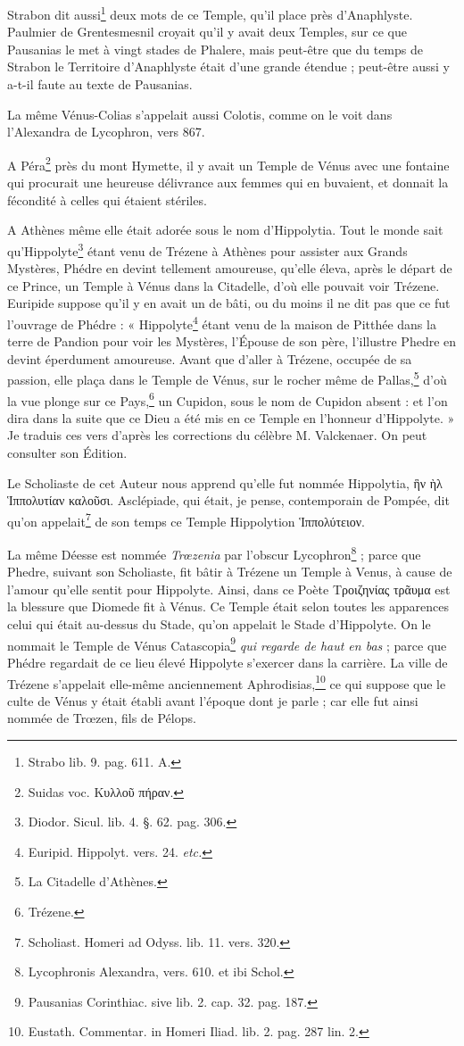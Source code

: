 \documentclass[a4paper, 18pt, oneside]{article}
\begin{document}
Strabon dit aussi\footnote{Strabo lib. 9. pag. 611. A.} deux mots de ce Temple, qu'il place près d'Anaphlyste. Paulmier de Grentesmesnil croyait qu'il y avait deux Temples, sur ce que Pausanias le met à vingt stades de Phalere, mais peut-être que du temps de Strabon le Territoire d'Anaphlyste était d'une grande étendue ; peut-être aussi y a-t-il faute au texte de Pausanias.

La même Vénus-Colias s'appelait aussi Colotis, comme on le voit dans l'Alexandra de Lycophron, vers 867.

A Péra\footnote{Suidas voc. Κυλλοῦ πήραν.} près du mont Hymette, il y avait un Temple de Vénus avec une fontaine qui procurait une heureuse délivrance aux femmes qui en buvaient, et donnait la fécondité à celles qui étaient stériles.

A Athènes même elle était adorée sous le nom d'Hippolytia. Tout le monde sait qu'Hippolyte\footnote{Diodor. Sicul. lib. 4. §. 62. pag. 306.} étant venu de Trézene à Athènes pour assister aux Grands Mystères, Phédre en devint tellement amoureuse, qu'elle éleva, après le départ de ce Prince, un Temple à Vénus dans la Citadelle, d'où elle pouvait voir Trézene. Euripide suppose qu'il y en avait un de bâti, ou du moins il ne dit pas que ce fut l'ouvrage de Phédre : « Hippolyte\footnote{Euripid. Hippolyt. vers. 24. \emph{etc.}} étant venu de la maison de Pitthée dans la terre de Pandion pour voir les Mystères, l'Épouse de son père, l'illustre Phedre en devint éperdument amoureuse. Avant que d'aller à Trézene, occupée de sa passion, elle plaça dans le Temple de Vénus, sur le rocher même de Pallas,\footnote{La Citadelle d'Athènes.} d'où la vue plonge sur ce Pays,\footnote{Trézene.} un Cupidon, sous le nom de Cupidon absent : et l'on dira dans la suite que ce Dieu a été mis en ce Temple en l'honneur d'Hippolyte. » Je traduis ces vers d'après les corrections du célèbre M. Valckenaer. On peut consulter son Édition.

Le Scholiaste de cet Auteur nous apprend qu'elle fut nommée Hippolytia, ἣν ὴλ Ἱππολυτίαν καλοῦσι. Asclépiade, qui était, je pense, contemporain de Pompée, dit qu'on appelait\footnote{Scholiast. Homeri ad Odyss. lib. 11. vers. 320.} de son temps ce Temple Hippolytion Ἱππολύτειον.

La même Déesse est nommée \emph{Trœzenia} par l'obscur Lycophron\footnote{Lycophronis Alexandra, vers. 610. et ibi Schol.} ; parce que Phedre, suivant son Scholiaste, fit bâtir à Trézene un Temple à Venus, à cause de l'amour qu'elle sentit pour Hippolyte. Ainsi, dans ce Poète Τροιζηνίας τρᾶυμα est la blessure que Diomede fit à Vénus. Ce Temple était selon toutes les apparences celui qui était au-dessus du Stade, qu'on appelait le Stade d'Hippolyte. On le nommait le Temple de Vénus Catascopia\footnote{Pausanias Corinthiac. sive lib. 2. cap. 32. pag. 187.} \emph{qui regarde de haut en bas} ; parce que Phédre regardait de ce lieu élevé Hippolyte s'exercer dans la carrière. La ville de Trézene s'appelait elle-même anciennement Aphrodisias,\footnote{Eustath. Commentar. in Homeri Iliad. lib. 2. pag. 287 lin. 2.} ce qui suppose que le culte de Vénus y était établi avant l'époque dont je parle ; car elle fut ainsi nommée de Trœzen, fils de Pélops.
\end{document}

